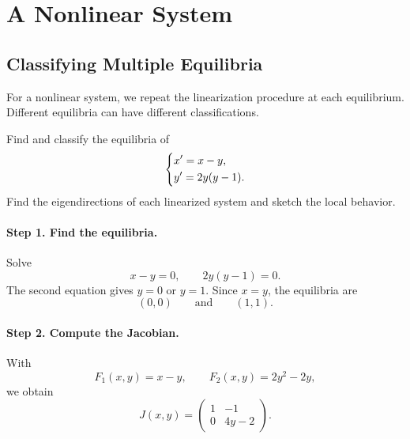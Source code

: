\documentclass[10pt,letterpaper]{article}
\begin{document}
\section{A Nonlinear System}

\subsection{Classifying Multiple Equilibria}

For a nonlinear system, we repeat the linearization
procedure at each equilibrium. Different equilibria
can have different classifications.

\begin{example}[5]{
Find and classify the equilibria of
\[
\begin{dcases}
x'=x-y,\\
y'=2y(y-1).
\end{dcases}
\]
Find the eigendirections of each linearized system
and sketch the local behavior.
}

\paragraph{Step 1. Find the equilibria.}
Solve
\[
x-y=0,\qquad 2y(y-1)=0.
\]
The second equation gives $y=0$ or $y=1$.
Since $x=y$, the equilibria are
\[
\boxed{(0,0)\qquad\text{and}\qquad(1,1).}
\]

\paragraph{Step 2. Compute the Jacobian.}
With
\[
F_1(x,y)=x-y,\qquad F_2(x,y)=2y^2-2y,
\]
we obtain
\[
J(x,y)=
\begin{pmatrix}
1&-1\\
0&4y-2
\end{pmatrix}.
\]


\end{example}
\end{document}
